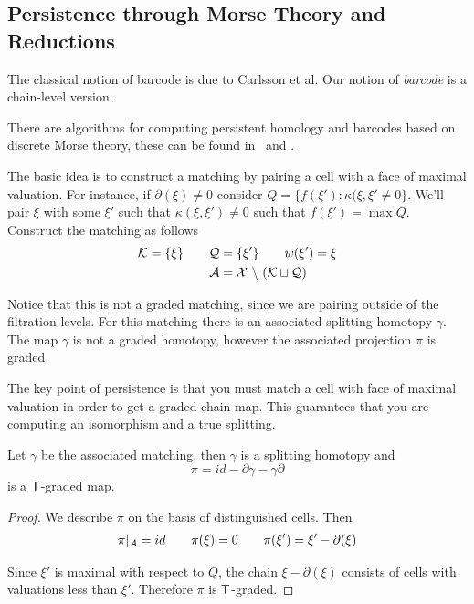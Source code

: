 
\subsection{Persistence through Morse Theory and Reductions}



The classical notion of barcode is due to Carlsson et al.  Our notion of {\em barcode} is a chain-level version.  

%


There are algorithms for computing persistent homology and barcodes based on discrete Morse theory, these can be found in~\cite[Algorithm 7]{dw} and \cite[Algorithm 2]{gbmr}.  

The basic idea is to construct a matching by pairing a cell with a face of maximal valuation.  For instance, if $\partial(\xi)\neq 0$ consider $Q = \{f(\xi'):\kappa(\xi,\xi'\neq 0\}$.  We'll pair $\xi$ with some $\xi'$ such that $\kappa(\xi,\xi')\neq 0$ such that $f(\xi')=\max Q$.  Construct the matching as follows
\begin{align*}
{\mathcal K} = \{\xi\} \quad\quad {\mathcal Q} &= \{\xi' \} \quad\quad w(\xi')=\xi \\
\quad\quad {\mathcal A} &= {\mathcal X}~\backslash~({\mathcal K}\sqcup {\mathcal Q})
\end{align*}

Notice that this is not a graded matching, since we are pairing outside of the filtration levels.  For this matching there is an associated splitting homotopy $\gamma$.  The map $\gamma$ is not a graded homotopy, however the associated projection $\pi$ is graded.

\begin{rem}
The key point of persistence is that you must match a cell with face of maximal valuation in order to get a graded chain map.  This guarantees that you are computing an isomorphism and a true splitting.
\end{rem}

\begin{prop}
Let $\gamma$ be the associated matching, then $\gamma$ is a splitting homotopy and $$\pi=id-\partial \gamma-\gamma \partial $$ is a ${\mathsf T}$-graded map.  
\end{prop}
\begin{proof}
We describe $\pi$ on the basis of distinguished cells.     Then
\begin{align*}
\pi|_{\mathcal A} = id \quad\quad
\pi(\xi) =  0 \quad\quad \pi(\xi') = \xi' - \partial (\xi)
\end{align*}

Since $\xi'$ is maximal with respect to $Q$, the chain $\xi-\partial(\xi)$ consists of cells with valuations less than $\xi'$.  Therefore $\pi$ is ${\mathsf T}$-graded.
\end{proof}

